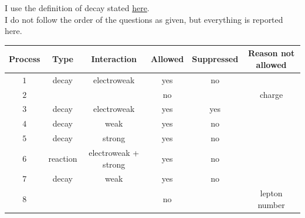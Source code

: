 I use the definition of decay stated \href{https://en.wikipedia.org/wiki/Particle_decay}{here}. \\
I do not follow the order of the questions as given, but everything is reported here.
\begin{table}[htbp]
    \centering
    \begin{tabular}{cccccc}
        \toprule
            Process & Type & Interaction & Allowed & Suppressed & Reason not allowed \\
        \midrule 
            $1$ & decay & electroweak & yes & no & \\
            $2$ & & & no & & charge \\
            $3$ & decay & electroweak & yes & yes & \\
            $4$ & decay & weak & yes & no & \\
            $5$ & decay & strong & yes & no & \\
            $6$ & reaction & electroweak + strong & yes & no & \\
            $7$ & decay & weak & yes & no & \\
            $8$ & & & no & & lepton number \\
        \bottomrule
    \end{tabular}
\end{table}

